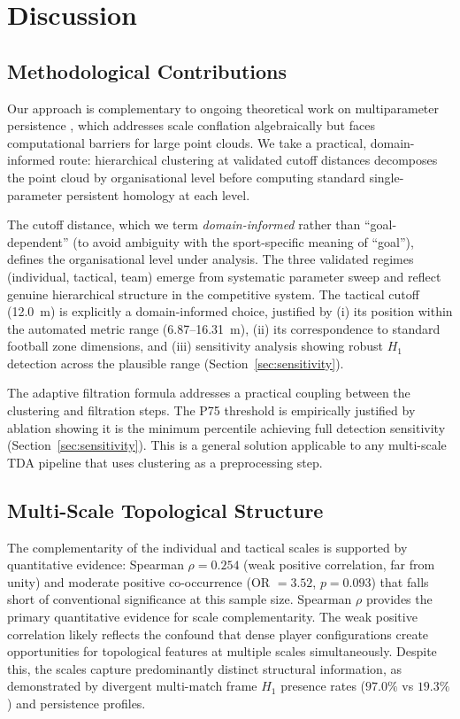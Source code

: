 \section{Discussion}
\label{sec:discussion}

\subsection{Methodological Contributions}

Our approach is complementary to ongoing theoretical work on multiparameter persistence \citep{BotnanLesnick2022}, which addresses scale conflation algebraically but faces computational barriers for large point clouds. We take a practical, domain-informed route: hierarchical clustering at validated cutoff distances decomposes the point cloud by organisational level before computing standard single-parameter persistent homology at each level.

The cutoff distance, which we term \emph{domain-informed} rather than ``goal-dependent'' (to avoid ambiguity with the sport-specific meaning of ``goal''), defines the organisational level under analysis. The three validated regimes (individual, tactical, team) emerge from systematic parameter sweep and reflect genuine hierarchical structure in the competitive system. The tactical cutoff (12.0~m) is explicitly a domain-informed choice, justified by (i) its position within the automated metric range (6.87--16.31~m), (ii) its correspondence to standard football zone dimensions, and (iii) sensitivity analysis showing robust \(H_1\) detection across the plausible range (Section~\ref{sec:sensitivity}).

The adaptive filtration formula addresses a practical coupling between the clustering and filtration steps. The P75 threshold is empirically justified by ablation showing it is the minimum percentile achieving full detection sensitivity (Section~\ref{sec:sensitivity}). This is a general solution applicable to any multi-scale TDA pipeline that uses clustering as a preprocessing step.

\subsection{Multi-Scale Topological Structure}

The complementarity of the individual and tactical scales is supported by quantitative evidence: Spearman \(\rho=0.254\) (weak positive correlation, far from unity) and moderate positive co-occurrence (OR \(=3.52\), \(p=0.093\)) that falls short of conventional significance at this sample size. Spearman \(\rho\) provides the primary quantitative evidence for scale complementarity. The weak positive correlation likely reflects the confound that dense player configurations create opportunities for topological features at multiple scales simultaneously. Despite this, the scales capture predominantly distinct structural information, as demonstrated by divergent multi-match frame \(H_1\) presence rates ($97.0\%$ vs $19.3\%$) and persistence profiles.

